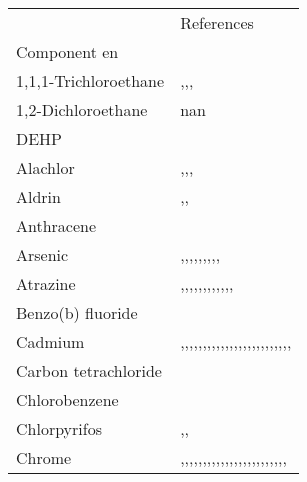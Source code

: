 \begin{tabular}{ll}
 & References \\
Component en &  \\
1,1,1-Trichloroethane & \cite{Ormad2008-bd},\cite{Bhattacharya_1996},\cite{Wu_2006},\cite{Khan_2019} \\
\cline{1-2}
1,2-Dichloroethane & nan \\
\cline{1-2}
DEHP & \cite{Kim2009-ik} \\
\cline{1-2}
Alachlor & \cite{Ormad_2008},\cite{RAHMANI201882},\cite{Gorito_2021},\cite{Stamatis_2010} \\
\cline{1-2}
Aldrin & \cite{Ormad_2008},\cite{RAHMANI201882},\cite{Katsoyiannis_2004} \\
\cline{1-2}
Anthracene & \cite{Teijon_2010} \\
\cline{1-2}
Arsenic & \cite{Feng_2018},\cite{Harper_1992},\cite{Drozdova_2018},\cite{Wu_2022},\cite{Balasubramanian_2001},\cite{Salehi_2020},\cite{Zhou_2018},\cite{Busetti_2005},\cite{Choubert_2011},\cite{Mass__1995} \\
\cline{1-2}
Atrazine & \cite{Teijon_2010},\cite{Mailler_2013},\cite{Stamatis_2010},\cite{RAHMANI201882},\cite{Hai_2020},\cite{Shahmahdi2020-ok},\cite{Gorito_2021},\cite{Ormad_2008},\cite{Scheideler_2011},\cite{Zhang_2021},\cite{Hijosa_Valsero_2013},\cite{Tkachenko2020-sk},\cite{Kruithof_2007} \\
\cline{1-2}
Benzo(b) fluoride & \cite{Teijon_2010} \\
\cline{1-2}
Cadmium & \cite{Lester_1979},\cite{Li_2010},\cite{da_Silva_Oliveira_2007},\cite{SORME_2002},\cite{Yoshida_2015},\cite{Mass__1995},\cite{Buzier_2006},\cite{Poon_1986},\cite{Busetti_2005},\cite{Goldstone_1990},\cite{Choubert_2011},\cite{Moriyama_1988},\cite{Drozdova_2018},\cite{Honarmandrad_2020},\cite{Sterritt_1981},\cite{Brown_1973},\cite{Samarghandi_2007},\cite{Hargreaves_2016},\cite{Nieminski_1995},\cite{Karvelas_2003},\cite{Mahmoudkhani_2014},\cite{Lester_1983},\cite{Zhou_2018},\cite{OLIVER_1974},\cite{Sudo_1973},\cite{Gardner_2013} \\
\cline{1-2}
Carbon tetrachloride & \cite{Bhattacharya_1996} \\
\cline{1-2}
Chlorobenzene & \cite{Bhattacharya_1996} \\
\cline{1-2}
Chlorpyrifos & \cite{Ormad_2008},\cite{RAHMANI201882},\cite{Stamatis_2010} \\
\cline{1-2}
Chrome & \cite{Lester_1979},\cite{da_Silva_Oliveira_2007},\cite{Yoshida_2015},\cite{Feng_2018},\cite{Marzougui_2018},\cite{Buzier_2006},\cite{Orescanin_2013},\cite{Busetti_2005},\cite{Goldstone_1990},\cite{Choubert_2011},\cite{Stoveland_1979},\cite{Moriyama_1988},\cite{Drozdova_2018},\cite{Sterritt_1981},\cite{Brown_1973},\cite{Hargreaves_2016},\cite{Karvelas_2003},\cite{Lester_1983},\cite{Mansourri_2016},\cite{Zhou_2018},\cite{OLIVER_1974},\cite{Chen_2005},\cite{Edokpayi_2015},\cite{Sudo_1973},\cite{Gardner_2013} \\

\end{tabular}
